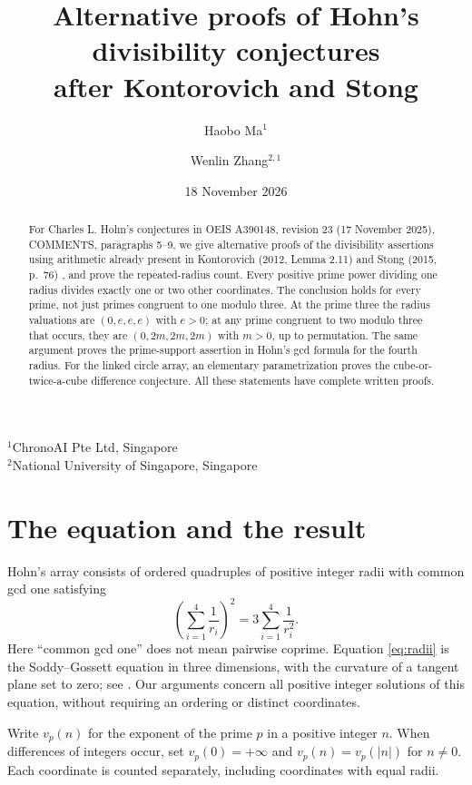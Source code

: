 \documentclass[11pt]{article}
\title{Alternative proofs of Hohn's divisibility conjectures\\
after Kontorovich and Stong}
\author{Haobo Ma$^1$ \and Wenlin Zhang$^{2,1}$}
\date{18 November 2026}
\begin{document}
\maketitle
\begin{center}
\small $^1$ChronoAI Pte Ltd, Singapore\\
$^2$National University of Singapore, Singapore
\end{center}
\begin{abstract}
For Charles L. Hohn's conjectures in OEIS A390148, revision 23
(17 November 2025), COMMENTS, paragraphs 5--9, we give alternative
proofs of the divisibility assertions using arithmetic already present in
Kontorovich (2012, Lemma 2.11) and Stong (2015, p.~76)
\cite{kontorovich,stong}, and prove the repeated-radius count.
Every positive prime power dividing one radius divides exactly one or two
other coordinates. The conclusion holds for every
prime, not just primes congruent to one modulo three. At the prime three the
radius valuations are $(0,e,e,e)$ with $e>0$; at any prime congruent to two
modulo three that occurs, they are $(0,2m,2m,2m)$ with $m>0$, up to
permutation. The same argument proves the prime-support assertion in Hohn's
gcd formula for the fourth radius. For the linked circle
array, an elementary parametrization proves the cube-or-twice-a-cube
difference conjecture. All these statements have complete written proofs.
\end{abstract}

\section{The equation and the result}
Hohn's array \cite{hohn} consists of ordered quadruples of positive integer
radii with common gcd one satisfying
\begin{equation}\label{eq:radii}
 \left(\sum_{i=1}^4\frac1{r_i}\right)^2
       =3\sum_{i=1}^4\frac1{r_i^2}.
\end{equation}
Here ``common gcd one'' does not mean pairwise coprime. Equation
\eqref{eq:radii} is the Soddy--Gossett equation in three dimensions, with
the curvature of a tangent plane set to zero; see \cite[Theorem 1.2]{lmw}.
Our arguments concern all positive integer solutions of this equation,
without requiring an ordering or distinct coordinates.

Write $v_p(n)$ for the exponent of the prime $p$ in a positive integer $n$.
When differences of integers occur, set $v_p(0)=+\infty$ and
$v_p(n)=v_p(|n|)$ for $n\ne0$. Each coordinate is counted separately,
including coordinates with equal radii.
\end{document}
